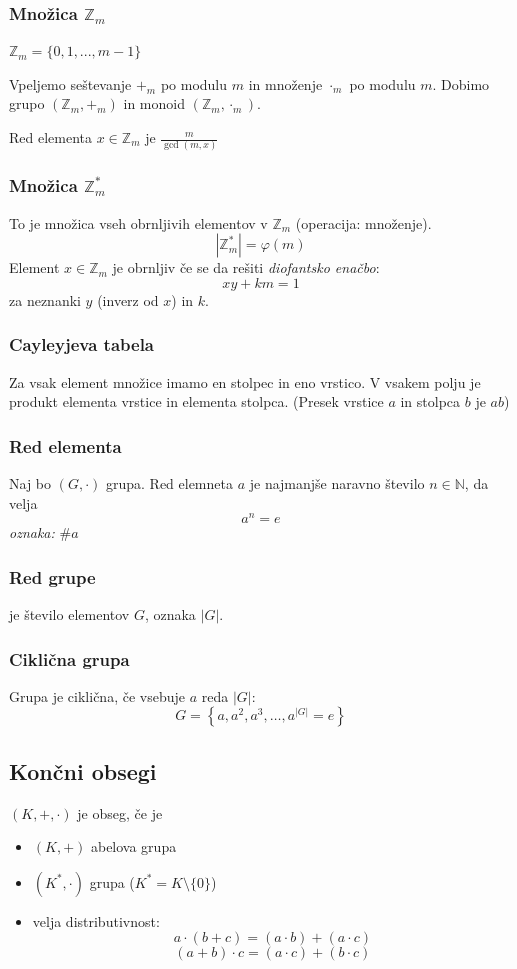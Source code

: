 \begin{multicols}{5}
\subsubsection{Množica $\mathbb{Z}_m$}
$\mathbb{Z}_m = \{0,1,...,m-1\}$

Vpeljemo seštevanje $+_m$ po modulu $m$ in množenje $\cdot_m$ po modulu $m$. 
Dobimo grupo $(\mathbb{Z}_m, +_m)$ in monoid $(\mathbb{Z}_m, \cdot_m)$.

Red elementa $x\in \mathbb{Z}_m$ je $\frac{m}{\gcd(m,x)}$

\subsubsection{Množica $\mathbb{Z}_m^*$}
To je množica vseh obrnljivih elementov v $\mathbb{Z}_m$ (operacija: množenje).
\[|\mathbb{Z}^*_m| = \varphi(m)\]
Element $x\in \mathbb{Z}_m$ je obrnljiv če se da rešiti \emph{diofantsko enačbo}:
\[ xy + km = 1\]
za neznanki $y$ (inverz od $x$) in $k$.

\subsubsection{Cayleyjeva tabela}
Za vsak element množice imamo en stolpec in eno vrstico. V vsakem polju je produkt elementa vrstice in elementa stolpca.
(Presek vrstice $a$ in stolpca $b$ je $ab$)

\subsubsection{Red elementa}
Naj bo $(G,\cdot)$ grupa. Red elemneta $a$ je najmanjše naravno število $n \in \mathbb{N}$, da velja
\[a^n = e\]
\textit{oznaka:} $\#a$

\subsubsection{Red grupe}
je število elementov $G$, oznaka $|G|$.

\subsubsection*{Ciklična grupa}
Grupa je ciklična, če vsebuje $a$ reda $|G|$:
\[ G = \left\{ a, a^2, a^3, \dots, a^{|G|} = e\right\}\]

\subsection*{Končni obsegi}
$(K, +,\cdot)$ je obseg, če je
\begin{itemize}
	\item $(K, +)$ abelova grupa
	\item $(K^*, \cdot)$ grupa ($K^* = K \setminus \{0\}$)
	\item velja distributivnost:
	\[ a \cdot (b+c) = (a\cdot b) + (a \cdot c)\]
	\[ (a+b) \cdot c = (a\cdot c) + (b \cdot c)\]
\end{itemize}


\end{multicols}
